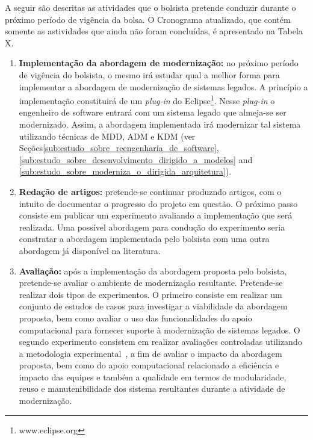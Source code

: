 A seguir são descritas as atividades que o bolsista pretende conduzir durante o próximo período de vigência da bolsa. O Cronograma atualizado, que contém somente as astividades que ainda não foram concluídas, é apresentado na Tabela X.

\begin{enumerate}
	\item \textbf{Implementação da abordagem de modernização:} no próximo período de vigência do bolsista, o mesmo irá estudar qual a melhor forma para implementar a abordagem de modernização de sistemas legados. A princípio a implementação constituirá de um \textit{plug-in} do Eclipse\footnote{www.eclipse.org}. Nesse \textit{plug-in} o engenheiro de software entrará com um sistema legado que almeja-se ser modernizado. Assim, a abordagem implementada irá modernizar tal sistema utilizando técnicas de MDD, ADM e KDM (ver Seções\ref{sub:estudo_sobre_reengenharia_de_software}, \ref{sub:estudo_sobre_desenvolvimento_dirigido_a_modelos} and \ref{sub:estudo_sobre_moderniza_o_dirigida_arquitetura}).

	\item \textbf{Redação de artigos:} pretende-se continuar produzndo artigos, com o intuito de documentar o progresso do projeto em questão. O próximo passo consiste em publicar um experimento avaliando a implementação que será realizada. Uma possível abordagem para condução do experimento seria constratar a abordagem implementada pelo bolsista com uma outra abordagem já disponível na literatura.

	\item \textbf{Avaliação:} após a implementação da abordagem proposta pelo bolsista, pretende-se avaliar o ambiente de modernização resultante. Pretende-se realizar dois tipos de experimentos. O primeiro consiste em realizar um conjunto de estudos de casos para investigar a viabilidade da abordagem proposta, bem como avaliar o uso das funcionalidades do apoio computacional para fornecer suporte à modernização de sistemas legados. O segundo experimento consistem em realizar avaliações controladas utilizando a metodologia experimental~\cite{Wohlin}, a fim de avaliar o impacto da abordagem proposta, bem como do apoio computacional relacionado a eficiência e impacto das equipes e também a qualidade em termos de modularidade, reuso e manutenibilidade dos sistema resultantes durante a atividade de modernização. 
\end{enumerate}